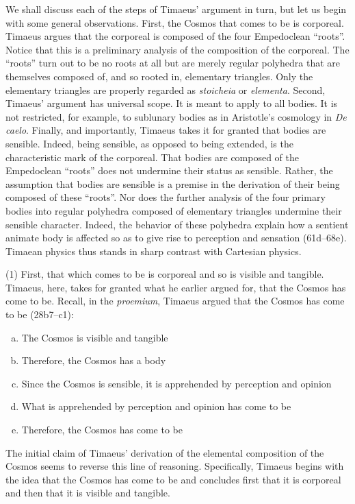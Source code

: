 We shall discuss each of the steps of Timaeus' argument in turn, but let us begin with some general observations. First, the Cosmos that comes to be is corporeal. Timaeus argues that the corporeal is composed of the four Empedoclean ``roots''. Notice that this is a preliminary analysis of the composition of the corporeal. The ``roots'' turn out to be no roots at all but are merely regular polyhedra that are themselves composed of, and so rooted in, elementary triangles. Only the elementary triangles are properly regarded as \emph{stoicheia} or \emph{elementa}. Second, Timaeus' argument has universal scope. It is meant to apply to all bodies. It is not restricted, for example, to sublunary bodies as in Aristotle's cosmology in \emph{De caelo}. Finally, and importantly, Timaeus takes it for granted that bodies are sensible. Indeed, being sensible, as opposed to being extended, is the characteristic mark of the corporeal. That bodies are composed of the Empedoclean ``roots'' does not undermine their status as sensible. Rather, the assumption that bodies are sensible is a premise in the derivation of their being composed of these ``roots''. Nor does the further analysis of the four primary bodies into regular polyhedra composed of elementary triangles undermine their sensible character. Indeed, the behavior of these polyhedra explain how a sentient animate body is affected so as to give rise to perception and sensation (61d--68e). Timaean physics thus stands in sharp contrast with Cartesian physics.

(1) First, that which comes to be is corporeal and so is visible and tangible. Timaeus, here, takes for granted what he earlier argued for, that the Cosmos has come to be. Recall, in the \emph{proemium}, Timaeus argued that the Cosmos has come to be (28b7--c1):
\begin{enumerate}[(a)]
	\item The Cosmos is visible and tangible
	\item Therefore, the Cosmos has a body
	\item Since the Cosmos is sensible, it is apprehended by perception and opinion
	\item What is apprehended by perception and opinion has come to be
	\item Therefore, the Cosmos has come to be
\end{enumerate}
The initial claim of Timaeus' derivation of the elemental composition of the Cosmos seems to reverse this line of reasoning. Specifically, Timaeus begins with the idea that the Cosmos has come to be and concludes first that it is corporeal and then that it is visible and tangible. 

